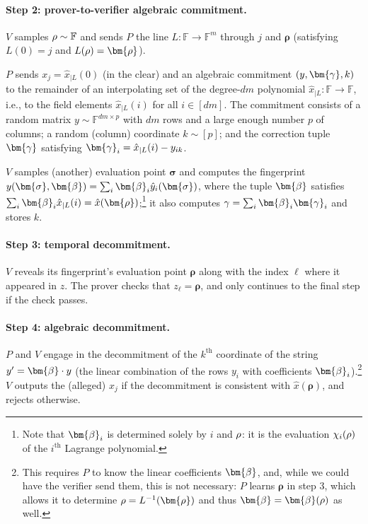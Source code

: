 \documentclass[a4paper,UKenglish,cleveref, autoref, thm-restate]{lipics-v2021}
\theoremstyle{definition}
\newcommand{\field}{\mathbb{F}}
\newcommand{\vcommitstring}{z}
\newcommand{\pcommitlength}{p}
\newcommand{\pcommitstring}{y}
\newcommand{\dimension}{m}
\newcommand{\degree}{d}
\newcommand{\evaluationpoint}{\bm{\fe2}}
\newcommand{\fingerprinttuple}{\bm{\rho}}
\newcommand{\Fingerprinttuple}{\bm{\sigma}}
\renewcommand{\line}{L}
\def\fe#1{
    \ifnum#1=1
        \alpha
    \else
    \ifnum#1=2
        \beta
    \else
    \ifnum#1=3
        \gamma
    \fi\fi\fi
}
\def\rfe#1{
    \ifnum#1=1
        \rho
    \else
    \ifnum#1=2
        \sigma
    \else
    \fi\fi
}
\begin{document}
    \paragraph*{Step 2: prover-to-verifier algebraic commitment\iflipics\else.\fi} $V$ samples $\rfe1 \sim \field$ and sends $P$ the line $\line: \field \to \field^\dimension$ through $j$ and $\fingerprinttuple$ (satisfying $\line(0) = j$ and $\line(\rfe1) = \fingerprinttuple$).
    
    $P$ sends $x_j = \hat x_{|\line}(0)$ (in the clear) and an algebraic commitment $(y, \bm{\fe3}, k)$ to the remainder of an interpolating set of the degree-$\degree\dimension$ polynomial $\hat x_{|\line}: \field \to \field$, i.e., to the field elements $\hat x_{|\line}(i)$ for all $i \in [\degree\dimension]$. The commitment consists of a random matrix $\pcommitstring \sim \field^{\degree\dimension \times \pcommitlength}$ with $\degree\dimension$ rows and a large enough number $\pcommitlength$ of columns; a random (column) coordinate $k \sim [\pcommitlength]$; and the correction tuple $\bm{\fe3}$ satisfying $\bm{\fe3}_i = \hat x_{|\line}(i) - \pcommitstring_{ik}$.
    
    $V$ samples (another) evaluation point $\Fingerprinttuple$ and computes the fingerprint $\pcommitstring(\Fingerprinttuple, \evaluationpoint) = \sum_i \evaluationpoint_i \hat \pcommitstring_i(\Fingerprinttuple)$, where the tuple $\evaluationpoint$ satisfies $\sum_i \evaluationpoint_i \hat x_{|\line}(i) = \hat x(\fingerprinttuple)$;\footnote{Note that $\evaluationpoint_i$ is determined solely by $i$ and $\rfe1$: it is the evaluation $\chi_i(\rfe1)$ of the $i^\text{th}$ Lagrange polynomial.} it also computes $\fe3 = \sum_i \evaluationpoint_i \bm{\fe3}_i$ and stores $k$.

    \paragraph*{Step 3: temporal decommitment\iflipics\else.\fi} $V$ reveals its fingerprint's evaluation point $\fingerprinttuple$ along with the index $\ell$ where it appeared in $\vcommitstring$. The prover checks that $\vcommitstring_\ell = \fingerprinttuple$, and only continues to the final step if the check passes.

    \paragraph*{Step 4: algebraic decommitment\iflipics\else.\fi} $P$ and $V$ engage in the decommitment of the $k^\text{th}$ coordinate of the string $\pcommitstring' = \bm{\fe2} \cdot \pcommitstring$ (the linear combination of the rows $\pcommitstring_i$ with coefficients $\evaluationpoint_i$).\footnote{This requires $P$ to know the linear coefficients $\bm{\fe2}$, and, while we could have the verifier send them, this is not necessary: $P$ learns $\fingerprinttuple$ in step 3, which allows it to determine $\rfe1 = \line^{-1}(\fingerprinttuple)$ and thus $\bm{\fe2} = \bm{\fe2}(\rfe1)$ as well.} $V$ outputs the (alleged) $x_j$ if the decommitment is consistent with $\hat x(\fingerprinttuple)$, and rejects otherwise.
\end{document}
